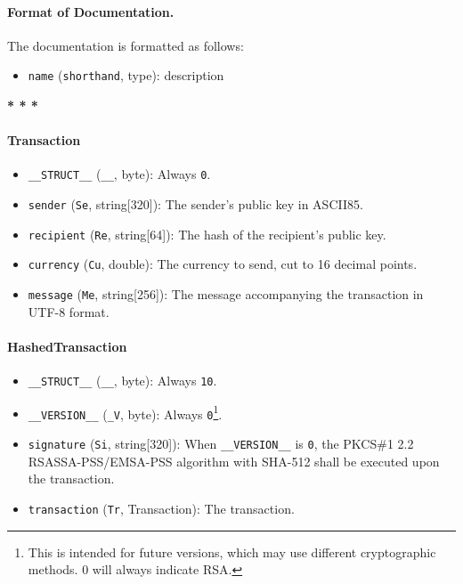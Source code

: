 \documentclass{article}
\begin{document}
{\paragraph{Format of Documentation.} The documentation is formatted as follows:
\begin{itemize}
	\item \verb|name| (\verb|shorthand|, type): description
\end{itemize}

\begin{center}
	{\bf{* * *}}
\end{center}

\paragraph{Transaction}
\begin{itemize}
	\item \verb|__STRUCT__| (\verb|__|, byte): Always \verb|0|.
	\item \verb|sender| (\verb|Se|, string[320]): The sender's public key
		in ASCII85.
	\item \verb|recipient| (\verb|Re|, string[64]): The hash of
		the recipient's public key.
	\item \verb|currency| (\verb|Cu|, double): The currency to send, cut to
		16 decimal points.
	\item \verb|message| (\verb|Me|, string[256]): The message accompanying
		the transaction in UTF-8 format.
\end{itemize}

\paragraph{HashedTransaction}
\begin{itemize}
	\item \verb|__STRUCT__| (\verb|__|, byte): Always \verb|10|.
	\item \verb|__VERSION__| (\verb|_V|, byte): Always \verb|0|\footnote{
			This is intended for future versions, which may use different
			cryptographic methods. 0 will always indicate RSA.
		}.
	\item \verb|signature| (\verb|Si|, string[320]): When \verb|__VERSION__| is
		\verb|0|, the PKCS\#1 2.2 RSASSA-PSS/EMSA-PSS algorithm with SHA-512
		shall be executed upon the transaction.
	\item \verb|transaction| (\verb|Tr|, Transaction): The transaction.
\end{itemize}

}
\end{document}
